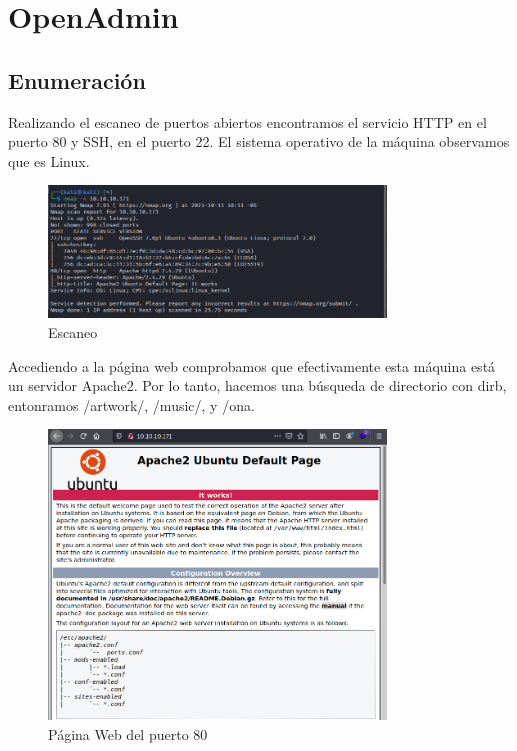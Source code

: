 \documentclass{article}
\begin{document}


\clearpage
\tableofcontents
\clearpage
\section{OpenAdmin}
\subsection{Enumeración}

Realizando el escaneo de puertos abiertos encontramos el servicio HTTP en el puerto 80 y SSH, en el puerto 22. El sistema operativo de la máquina observamos que es Linux.
\begin{figure}[H]
	\center
	\includegraphics[width=0.8\textwidth]{images/openadmin/1-escaneo.png}
	\caption{Escaneo}
\end{figure}

Accediendo a la página web comprobamos que efectivamente esta máquina está un servidor Apache2. Por lo tanto, hacemos una búsqueda de directorio con dirb, entonramos /artwork/, /music/, y /ona.
\begin{figure}[H]
	\center
	\includegraphics[width=0.8\textwidth]{images/openadmin/2-paginaweb.png}
	\caption{Página Web del puerto 80}
\end{figure}	
\end{document}
